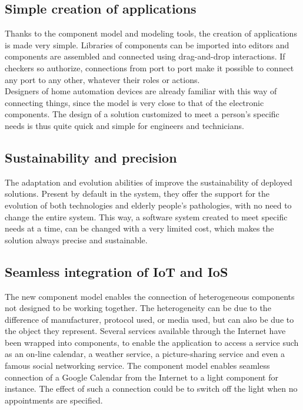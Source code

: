 \subsection{Simple creation of applications}
Thanks to the component model and modeling tools, the creation of applications is made very simple. Libraries of components can be imported into editors and components are assembled and connected using drag-and-drop interactions. If checkers so authorize, connections from port to port make it possible to connect any port to any other, whatever their roles or actions.\\
Designers of home automation devices are already familiar with this way of connecting things, since the model is very close to that of the electronic components. The design of a solution customized to meet a person's specific needs is thus quite quick and simple for engineers and technicians.

\subsection{Sustainability and precision}
The adaptation and evolution abilities of \enti{} improve the sustainability of deployed solutions. Present by default in the system, they offer the support for the evolution of both technologies and elderly people's pathologies, with no need to change the entire system. This way, a software system created to meet specific needs at a time, can be changed with a very limited cost, which makes the solution always precise and sustainable.

\subsection{Seamless integration of IoT and IoS}
The new component model enables the connection of heterogeneous components not designed to be working together. The heterogeneity can be due to the difference of manufacturer, protocol used, or media used, but can also be due to the object they represent. Several services available through the Internet have been wrapped into components, to enable the application to access a service such as an on-line calendar, a weather service, a picture-sharing service and even a famous social networking service. The component model enables seamless connection of a Google Calendar from the Internet to a light component for instance. The effect of such a connection could be to switch off the light when no appointments are specified.


